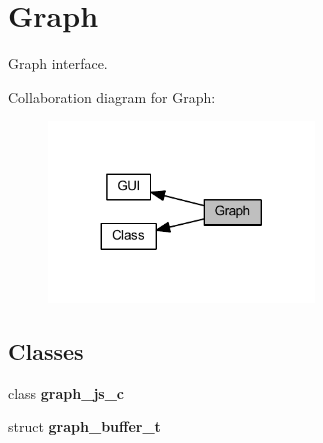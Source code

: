 \section{Graph}
\label{group___graph}


Graph interface.  


Collaboration diagram for Graph\+:
\nopagebreak
\begin{figure}[H]
\begin{center}
\leavevmode
\includegraphics[width=200pt]{group___graph}
\end{center}
\end{figure}
\subsection*{Classes}
\begin{DoxyCompactItemize}
\item 
class \textbf{ graph\+\_\+js\+\_\+c}
\item 
struct \textbf{ graph\+\_\+buffer\+\_\+t}
\end{DoxyCompactItemize}
